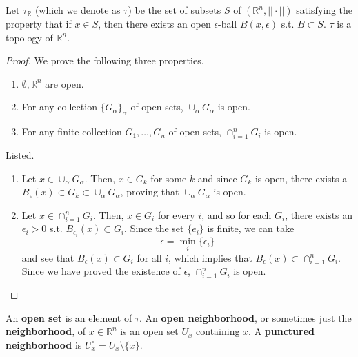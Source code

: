       \begin{theorem}
        Let $\tau_{\mathbb{R}}$ (which we denote as $\tau$) be the set of subsets $S$ of $(\mathbb{R}^n, || \cdot ||)$ satisfying the property that if $x \in S$, then there exists an open $\epsilon$-ball $B(x, \epsilon)$ s.t. $B \subset S$. $\tau$ is a topology of $\mathbb{R}^n$. 
      \end{theorem} 
      \begin{proof} 
        We prove the following three properties. 
        \begin{enumerate}
          \item $\emptyset, \mathbb{R}^n$ are open. 
          \item For any collection $\{G_\alpha\}_\alpha$ of open sets, $\cup_\alpha G_\alpha$ is open.  
          \item For any finite collection $G_1, \ldots, G_n$ of open sets, $\cap_{i=1}^n G_i$ is open. 
        \end{enumerate}
        Listed. 
        \begin{enumerate}
          \item Let $x \in \cup_\alpha G_\alpha$. Then, $x \in G_k$ for some $k$ and since $G_k$ is open, there exists a $B_\epsilon (x) \subset G_k \subset \cup_{\alpha} G_\alpha$, proving that $\cup_\alpha G_\alpha$ is open. 
          \item Let $x \in \cap_{i=1}^n G_i$. Then, $x \in G_i$ for every $i$, and so for each $G_i$, there exists an $\epsilon_i > 0$ s.t. $B_{\epsilon_i} (x) \subset G_i$. Since the set $\{e_i\}$ is finite, we can take 
          \[\epsilon = \min_i \{\epsilon_i\}\]
          and see that $B_\epsilon (x) \subset G_i$ for all $i$, which implies that $B_\epsilon (x) \subset \cap_{i=1}^n G_i$. Since we have proved the existence of $\epsilon$, $\cap_{i=1}^n G_i$ is open. 
        \end{enumerate}
      \end{proof}

      \begin{definition}
        An \textbf{open set} is an element of $\tau$. An \textbf{open neighborhood}, or sometimes just the \textbf{neighborhood}, of $x \in \mathbb{R}^n$ is an open set $U_x$ containing $x$. A \textbf{punctured neighborhood} is $U_x^{\circ} = U_x \setminus \{x\}$. 
      \end{definition}


